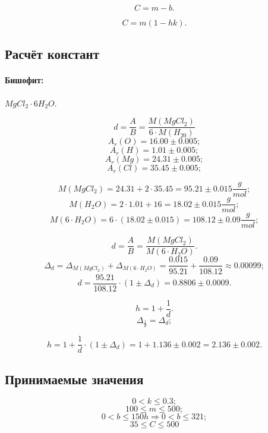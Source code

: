 $$C = m - b.$$

$$C = m (1 - h k).$$ 

\subsection{Расчёт констант}
\paragraph{Бишофит:} $MgCl_2 \cdot 6H_2O$.

$$d = \frac{A}{B} = \frac{M\left( MgCl_2 \right)}{6 \cdot M\left( H_20 \right)}$$
$$A_r\left( O \right) = 16.00 \pm 0.005;$$
$$A_r\left( H \right) = 1.01 \pm 0.005;$$
$$A_r\left( Mg \right) = 24.31 \pm 0.005;$$
$$A_r\left( Cl \right) = 35.45 \pm 0.005;$$

$$M\left( MgCl_2 \right) = 24.31 + 2 \cdot 35.45 = 95.21 \pm 0.015 \frac{g}{mol};$$
$$M\left( H_2O \right) = 2 \cdot 1.01 + 16 = 18.02 \pm 0.015 \frac{g}{mol};$$
$$M\left(6 \cdot H_2O \right) = 6 \cdot \left(18.02 \pm 0.015 \right) = 108.12 \pm 0.09 \frac{g}{mol};$$

$$d = \frac{A}{B} = \frac{M\left( MgCl_2 \right)}{M\left(6 \cdot H_2O \right)}.$$
$$\Delta_{d} 
	= \Delta_{M\left( MgCl_2 \right)} + \Delta_{M\left( 6 \cdot H_2O \right)} 
	= \frac{0.015}{95.21} + \frac{0.09}{108.12} 
	\approx 0.00099
;$$
$$d 
	= \frac{95.21}{108.12} \cdot \left( 1 \pm \Delta_d \right )
	= 0.8806 \pm 0.0009.
$$

$$h= 1 + \frac{1}{d}.$$
$$\Delta_\frac{1}{d} = \Delta_d;$$

$$h 
	= 1 + \frac{1}{d} \cdot \left( 1 \pm \Delta_d \right )
	= 1 + 1.136 \pm 0.002
	= 2.136 \pm 0.002.
$$

\subsection{Принимаемые значения}
$$0 < k \le 0.3;$$
$$100 \le m \le 500;$$
$$0 < b \le 150h \Rightarrow 0 < b \le 321;$$
$$35 \le C \le 500$$
